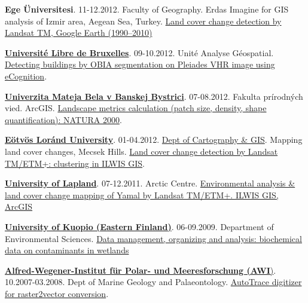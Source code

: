 \documentclass[10pt]{article}
\begin{document}
\textbf{Ege \"{U}niversitesi}. 11-12.2012. Faculty of Geography. Erdas Imagine for GIS analysis of Izmir area, Aegean Sea, Turkey. \href{https://www.researchgate.net/project/2012-Izmir-Turkey-Environmental-Analsysis-of-the-Aegean-Sea-Area}{Land cover change detection by Landsat TM, Google Earth (1990–2010)}
\vspace{5pt}

\href{http://www.ulb.ac.be/}{\textbf{Universit\'e Libre de Bruxelles}}. 09-10.2012. Unit\'e Analyse G\'eospatial. \href{https://www.researchgate.net/project/2012-Belgium-Brussels-OBIA-Object-Based-Image-Analysis-for-Urban-Mapping}{Detecting buildings by OBIA segmentation on Pleiades VHR image using eCognition}.
\vspace{5pt}

\href{http://www.umb.sk/umb/umbbb.nsf}{\textbf{Univerzita Mateja Bela v Banskej Bystrici}}. 07-08.2012. Fakulta prírodných vied. ArcGIS. \href{https://www.researchgate.net/project/2012-Slovakia-Banska-Bystrica-Environmental-Analysis}{Landscape metrics calculation (patch size, density, shape quantification): NATURA 2000}.
\vspace{5pt}

\href{http://www.elte.hu/}{\textbf{E\"otv\"os Lor\'and University}}. 01-04.2012. \href{http://lazarus.elte.hu/}{Dept of Cartography \& GIS}. Mapping land cover changes, Mecsek Hills. \href{https://www.researchgate.net/project/2012-Hungary-Budapest-ILWIS-GIS-for-Monitoring-Central-European-Landscapes}{Land cover change detection by Landsat TM/ETM+: clustering in ILWIS GIS}.
\vspace{5pt}

\href{http://www.arcticcentre.org/InEnglish.iw3}{\textbf{University of Lapland}}. 07-12.2011. Arctic Centre. \href{https://www.researchgate.net/project/2011-Finland-Lapland-ILWIS-GIS-and-Landsat-TM-ETM-for-Mapping-Land-Cover-Changes-in-of-Yamal-Russian-Arctic}{Environmental analysis \& land cover change mapping of Yamal by Landsat TM/ETM+. ILWIS GIS, ArcGIS}
\vspace{5pt}

\href{http://www.uef.fi/tutustu}{\textbf{University of Kuopio (Eastern Finland)}}. 06-09.2009. Department of Environmental Sciences. \href{https://www.researchgate.net/project/2009-Finland-Kuopio-Envionmental-Data-Managmenet}{Data management, organizing and analysis: biochemical data on contaminants in wetlands}
\vspace{5pt}

\href{https://www.awi.de/}{\textbf{Alfred-Wegener-Institut f\"{u}r Polar- und Meeresforschung (AWI})}. 10.2007-03.2008. Dept of Marine Geology and Palaeontology. \href{https://www.researchgate.net/project/2007-2008-Germany-Bremerhaven-AutoTrace-Software-for-Digitizing-Maps}{AutoTrace digitizer for raster2vector conversion}. 
\vspace{5pt}
\end{document}
